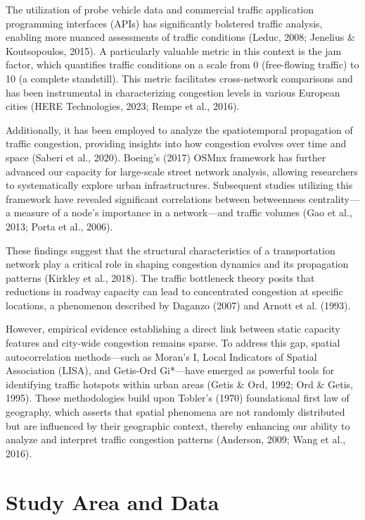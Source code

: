 \documentclass[12pt,a4paper]{article}
\begin{document}
The utilization of probe vehicle data and commercial traffic application programming interfaces (APIs) has significantly bolstered traffic analysis, enabling more nuanced assessments of traffic conditions (Leduc, 2008; Jenelius \& Koutsopoulos, 2015). A particularly valuable metric in this context is the jam factor, which quantifies traffic conditions on a scale from 0 (free-flowing traffic) to 10 (a complete standstill). This metric facilitates cross-network comparisons and has been instrumental in characterizing congestion levels in various European cities (HERE Technologies, 2023; Rempe et al., 2016).

Additionally, it has been employed to analyze the spatiotemporal propagation of traffic congestion, providing insights into how congestion evolves over time and space (Saberi et al., 2020). Boeing's (2017) OSMnx framework has further advanced our capacity for large-scale street network analysis, allowing researchers to systematically explore urban infrastructures. Subsequent studies utilizing this framework have revealed significant correlations between betweenness centrality---a measure of a node's importance in a network---and traffic volumes (Gao et al., 2013; Porta et al., 2006).

These findings suggest that the structural characteristics of a transportation network play a critical role in shaping congestion dynamics and its propagation patterns (Kirkley et al., 2018). The traffic bottleneck theory posits that reductions in roadway capacity can lead to concentrated congestion at specific locations, a phenomenon described by Daganzo (2007) and Arnott et al. (1993).

However, empirical evidence establishing a direct link between static capacity features and city-wide congestion remains sparse. To address this gap, spatial autocorrelation methods---such as Moran's I, Local Indicators of Spatial Association (LISA), and Getis-Ord Gi*---have emerged as powerful tools for identifying traffic hotspots within urban areas (Getis \& Ord, 1992; Ord \& Getis, 1995). These methodologies build upon Tobler's (1970) foundational first law of geography, which asserts that spatial phenomena are not randomly distributed but are influenced by their geographic context, thereby enhancing our ability to analyze and interpret traffic congestion patterns (Anderson, 2009; Wang et al., 2016).



\section{Study Area and Data}
\end{document}
